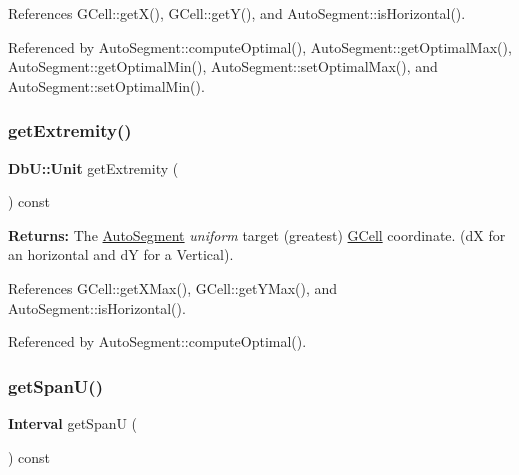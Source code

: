 References G\+Cell\+::get\+X(), G\+Cell\+::get\+Y(), and Auto\+Segment\+::is\+Horizontal().



Referenced by Auto\+Segment\+::compute\+Optimal(), Auto\+Segment\+::get\+Optimal\+Max(), Auto\+Segment\+::get\+Optimal\+Min(), Auto\+Segment\+::set\+Optimal\+Max(), and Auto\+Segment\+::set\+Optimal\+Min().

\mbox{\label{classKatabatic_1_1AutoSegment_a5b81aad92361558c3b9e60fd501b89ba}} 
\subsubsection{\texorpdfstring{get\+Extremity()}{getExtremity()}}
{\footnotesize\ttfamily \textbf{ Db\+U\+::\+Unit} get\+Extremity (\begin{DoxyParamCaption}{ }\end{DoxyParamCaption}) const\hspace{0.3cm}{\ttfamily [inline]}}

{\bfseries Returns\+:} The \mbox{\hyperlink{classKatabatic_1_1AutoSegment}{Auto\+Segment}} {\itshape uniform} target (greatest) \mbox{\hyperlink{classKatabatic_1_1GCell}{G\+Cell}} coordinate. (dX for an horizontal and dY for a Vertical). 

References G\+Cell\+::get\+X\+Max(), G\+Cell\+::get\+Y\+Max(), and Auto\+Segment\+::is\+Horizontal().



Referenced by Auto\+Segment\+::compute\+Optimal().

\mbox{\label{classKatabatic_1_1AutoSegment_a248eb2fbb06e3286650b28567d495f0b}} 
\subsubsection{\texorpdfstring{get\+Span\+U()}{getSpanU()}}
{\footnotesize\ttfamily \textbf{ Interval} get\+SpanU (\begin{DoxyParamCaption}{ }\end{DoxyParamCaption}) const\hspace{0.3cm}{\ttfamily [pure virtual]}}

